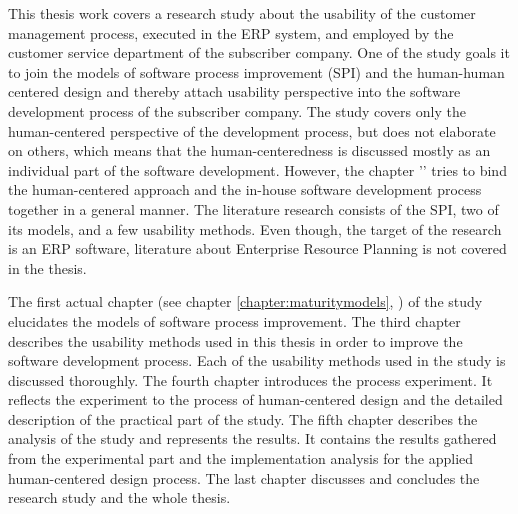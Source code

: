 \documentclass[12pt,a4paper,oneside,pdftex]{report}
\begin{document}
This thesis work covers a research study about the usability of the customer management process, executed in the ERP system, and employed by the customer service department of the subscriber company. One of the study goals it to join the models of software process improvement (SPI) and the human-human centered design and thereby attach usability perspective into the software development process of the subscriber company. The study covers only the human-centered perspective of the development process, but does not elaborate on others, which means that the human-centeredness is discussed mostly as an individual part of the software development. However, the chapter '' tries to bind the human-centered approach and the in-house software development process together in a general manner. The literature research consists of the SPI, two of its models, and a few usability methods. Even though, the target of the research is an ERP software, literature about Enterprise Resource Planning is not covered in the thesis.

The first actual chapter (see chapter \ref{chapter:maturitymodels}, ) of the study elucidates the models of software process improvement. The third chapter describes the usability methods used in this thesis in order to improve the software development process. Each of the usability methods used in the study is discussed thoroughly. The fourth chapter introduces the process experiment. It reflects the experiment to the process of human-centered design and the detailed description of the practical part of the study. The fifth chapter describes the analysis of the study and represents the results. It contains the results gathered from the experimental part and the implementation analysis for the applied human-centered design process. The last chapter discusses and concludes the research study and the whole thesis.

    
    





\end{document}
